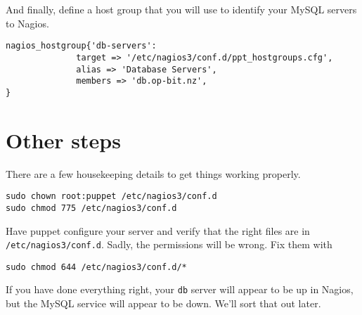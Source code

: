 \documentclass{article}         %
\begin{document}
And finally, define a host group that you will use to 
identify your MySQL servers to Nagios.

\begin{verbatim}
nagios_hostgroup{'db-servers':
              target => '/etc/nagios3/conf.d/ppt_hostgroups.cfg',
              alias => 'Database Servers',
              members => 'db.op-bit.nz',
}

\end{verbatim}


\section{Other steps}

There are a few housekeeping details to get things working properly.

\begin{verbatim}
sudo chown root:puppet /etc/nagios3/conf.d
sudo chmod 775 /etc/nagios3/conf.d 
\end{verbatim}

Have puppet configure your server and verify that the right files are in 
\texttt{/etc/nagios3/conf.d}.  Sadly, the permissions will be wrong.  
Fix them with

\begin{verbatim}
sudo chmod 644 /etc/nagios3/conf.d/* 
\end{verbatim}

If you have done everything right, your \texttt{db} server will appear to be up in Nagios,
but the MySQL service will appear to be down. We'll sort that out later.
\end{document}

